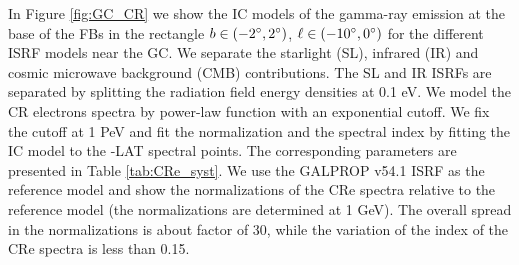 In Figure \ref{fig:GC_CR} we show the IC models of the gamma-ray emission 
at the base of the FBs in the rectangle $b \in (-2^\circ, 2^\circ)$, $\ell \in (-10^\circ, 0^\circ)$
for the different ISRF models near the GC.
We separate the starlight (SL), infrared (IR) and cosmic microwave background (CMB) contributions.
The SL and IR ISRFs are separated by splitting the radiation field energy densities at 0.1 eV.
We model the CR electrons spectra by power-law function with an exponential cutoff.
We fix the cutoff at 1 PeV and fit the normalization and the spectral index by fitting 
the IC model to the \Fermi-LAT spectral points.
The corresponding parameters are presented in Table \ref{tab:CRe_syst}.
We use the GALPROP v54.1 ISRF as the reference model and show the normalizations of the CRe spectra
relative to the reference model (the normalizations are determined at 1 GeV).
The overall spread in the normalizations is about factor of 30,
while the variation of the index of the CRe spectra is less than 0.15.

